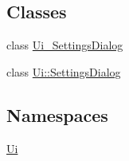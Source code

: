\subsection*{Classes}
\begin{DoxyCompactItemize}
\item 
class \hyperlink{a00029}{Ui\+\_\+\+Settings\+Dialog}
\item 
class \hyperlink{a00023}{Ui\+::\+Settings\+Dialog}
\end{DoxyCompactItemize}
\subsection*{Namespaces}
\begin{DoxyCompactItemize}
\item 
 \hyperlink{a00055}{Ui}
\end{DoxyCompactItemize}
